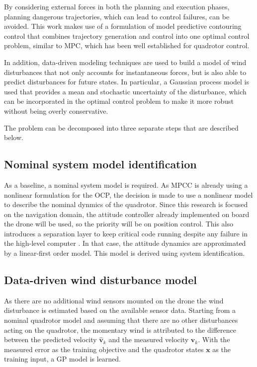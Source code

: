 By considering external forces in both the planning and execution phases, planning dangerous trajectories, which can lead to control failures, can be avoided. This work makes use of a formulation of model predictive contouring control that combines trajectory generation and control into one optimal control problem, similar to MPC, which has been well established for quadrotor control. 

In addition, data-driven modeling techniques are used to build a model of wind disturbances that not only accounts for instantaneous forces, but is also able to predict disturbances for future states. In particular, a Gaussian process model is used that provides a mean and stochastic uncertainty of the disturbance, which can be incorporated in the optimal control problem to make it more robust without being overly conservative.

The problem can be decomposed into three separate steps that are described below. 

\subsection{Nominal system model identification}

As a baseline, a nominal system model is required. As MPCC is already using a nonlinear formulation for the OCP, the decision is made to use a nonlinear model to describe the nominal dynmics of the quadrotor. Since this research is focused on the navigation domain, the attitude controller already implemented on board the drone will be used, so the priority will be on position control. This also introduces a separation layer to keep critical code running despite any failure in the high-level computer \cite{kamel2017linear}. In that case, the attitude dynamics are approximated by a linear-first order model. This model is derived using system identification. 

\subsection{Data-driven wind disturbance model}

As there are no additional wind sensors mounted on the drone the wind disturbance is estimated based on the available sensor data. Starting from a nominal quadrotor model and assuming that there are no other disturbances acting on the quadrotor, the momentary wind is attributed to the difference between the predicted velocity $\hat{\mathbf{v}}_k$ and the measured velocity $\mathbf{v}_k$. With the measured error as the training objective and the quadrotor states $\mathbf{x}$ as the training input, a GP model is learned.

